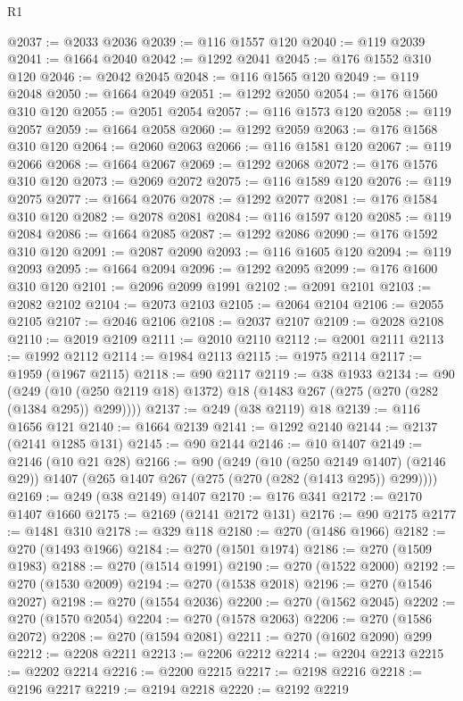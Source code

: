 \begin{lexlean}{R1}
\begin{coremodule}
@2037 := @2033 @2036
@2039 := @116 @1557 @120
@2040 := @119 @2039
@2041 := @1664 @2040
@2042 := @1292 @2041
@2045 := @176 @1552 @310 @120
@2046 := @2042 @2045
@2048 := @116 @1565 @120
@2049 := @119 @2048
@2050 := @1664 @2049
@2051 := @1292 @2050
@2054 := @176 @1560 @310 @120
@2055 := @2051 @2054
@2057 := @116 @1573 @120
@2058 := @119 @2057
@2059 := @1664 @2058
@2060 := @1292 @2059
@2063 := @176 @1568 @310 @120
@2064 := @2060 @2063
@2066 := @116 @1581 @120
@2067 := @119 @2066
@2068 := @1664 @2067
@2069 := @1292 @2068
@2072 := @176 @1576 @310 @120
@2073 := @2069 @2072
@2075 := @116 @1589 @120
@2076 := @119 @2075
@2077 := @1664 @2076
@2078 := @1292 @2077
@2081 := @176 @1584 @310 @120
@2082 := @2078 @2081
@2084 := @116 @1597 @120
@2085 := @119 @2084
@2086 := @1664 @2085
@2087 := @1292 @2086
@2090 := @176 @1592 @310 @120
@2091 := @2087 @2090
@2093 := @116 @1605 @120
@2094 := @119 @2093
@2095 := @1664 @2094
@2096 := @1292 @2095
@2099 := @176 @1600 @310 @120
@2101 := @2096 @2099 @1991
@2102 := @2091 @2101
@2103 := @2082 @2102
@2104 := @2073 @2103
@2105 := @2064 @2104
@2106 := @2055 @2105
@2107 := @2046 @2106
@2108 := @2037 @2107
@2109 := @2028 @2108
@2110 := @2019 @2109
@2111 := @2010 @2110
@2112 := @2001 @2111
@2113 := @1992 @2112
@2114 := @1984 @2113
@2115 := @1975 @2114
@2117 := @1959 (@1967 @2115)
@2118 := @90 @2117
@2119 := @38 @1933
@2134 := @90
    (@249 (@10 (@250 @2119 @18) @1372) @18 (@1483 @267 (@275 (@270 (@282 (@1384 @295)) @299))))
@2137 := @249 (@38 @2119) @18
@2139 := @116 @1656 @121
@2140 := @1664 @2139
@2141 := @1292 @2140
@2144 := @2137 (@2141 @1285 @131)
@2145 := @90 @2144
@2146 := @10 @1407
@2149 := @2146 (@10 @21 @28)
@2166 := @90
    (@249
      (@10 (@250 @2149 @1407) (@2146 @29))
      @1407
      (@265 @1407 @267 (@275 (@270 (@282 (@1413 @295)) @299))))
@2169 := @249 (@38 @2149) @1407
@2170 := @176 @341
@2172 := @2170 @1407 @1660
@2175 := @2169 (@2141 @2172 @131)
@2176 := @90 @2175
@2177 := @1481 @310
@2178 := @329 @118
@2180 := @270 (@1486 @1966)
@2182 := @270 (@1493 @1966)
@2184 := @270 (@1501 @1974)
@2186 := @270 (@1509 @1983)
@2188 := @270 (@1514 @1991)
@2190 := @270 (@1522 @2000)
@2192 := @270 (@1530 @2009)
@2194 := @270 (@1538 @2018)
@2196 := @270 (@1546 @2027)
@2198 := @270 (@1554 @2036)
@2200 := @270 (@1562 @2045)
@2202 := @270 (@1570 @2054)
@2204 := @270 (@1578 @2063)
@2206 := @270 (@1586 @2072)
@2208 := @270 (@1594 @2081)
@2211 := @270 (@1602 @2090) @299
@2212 := @2208 @2211
@2213 := @2206 @2212
@2214 := @2204 @2213
@2215 := @2202 @2214
@2216 := @2200 @2215
@2217 := @2198 @2216
@2218 := @2196 @2217
@2219 := @2194 @2218
@2220 := @2192 @2219

\end{coremodule}
\end{lexlean}
